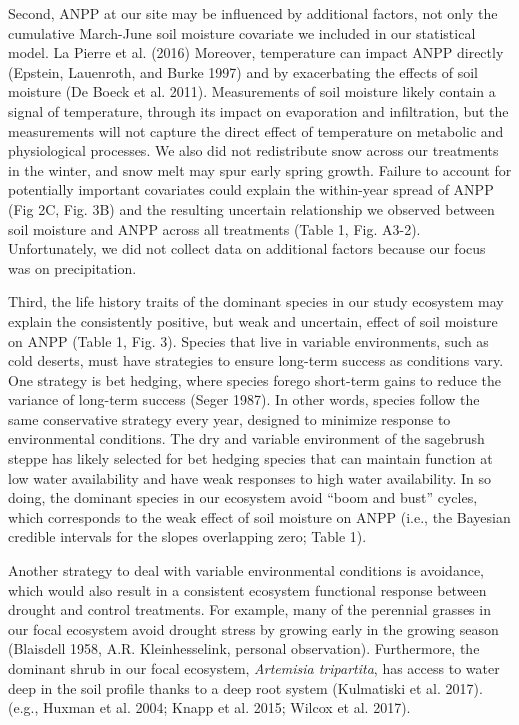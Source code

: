 \documentclass[fleqn,10pt,lineno]{wlpeerj} %
\begin{document}
Second, ANPP at our site may be influenced by additional factors, not
only the cumulative March-June soil moisture covariate we included in
our statistical model.  La Pierre et al. (2016)
Moreover, temperature can impact ANPP directly (Epstein, Lauenroth, and
Burke 1997) and by exacerbating the effects of soil moisture (De Boeck
et al. 2011). Measurements of soil moisture likely contain a signal of
temperature, through its impact on evaporation and infiltration, but the
measurements will not capture the direct effect of temperature on
metabolic and physiological processes. We also did not redistribute snow
across our treatments in the winter, and snow melt may spur early spring
growth. Failure to account for potentially important covariates could
explain the within-year spread of ANPP (Fig 2C, Fig. 3B) and the
resulting uncertain relationship we observed between soil moisture and
ANPP across all treatments (Table 1, Fig. A3-2). Unfortunately, we did
not collect data on additional factors because our focus was on
precipitation.

Third, the life history traits of the dominant species in our study
ecosystem may explain the consistently positive, but weak and uncertain,
effect of soil moisture on ANPP (Table 1, Fig. 3). Species that live in
variable environments, such as cold deserts, must have strategies to
ensure long-term success as conditions vary. One strategy is bet
hedging, where species forego short-term gains to reduce the variance of
long-term success (Seger 1987). In other words, species follow the same
conservative strategy every year, designed to minimize response to
environmental conditions. The dry and variable environment of the
sagebrush steppe has likely selected for bet hedging species that can
maintain function at low water availability and have weak responses to
high water availability. In so doing, the dominant species in our
ecosystem avoid ``boom and bust'' cycles, which corresponds to the weak
effect of soil moisture on ANPP (i.e., the Bayesian credible intervals
for the slopes overlapping zero; Table 1).

Another strategy to deal with variable environmental conditions is
avoidance, which would also result in a consistent ecosystem functional
response between drought and control treatments. For example, many of
the perennial grasses in our focal ecosystem avoid drought stress by
growing early in the growing season (Blaisdell 1958, A.R.
Kleinhesselink, personal observation). Furthermore, the dominant shrub
in our focal ecosystem, \emph{Artemisia tripartita}, has access to water
deep in the soil profile thanks to a deep root system (Kulmatiski et al.
2017).
(e.g., Huxman et al. 2004; Knapp et al. 2015; Wilcox et al. 2017).
\end{document}
